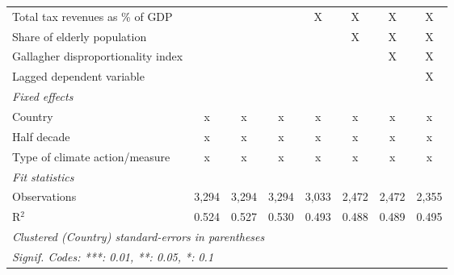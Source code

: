 \begin{table}[htbp]
\begin{tabular}{lccccccc}
      Total tax revenues as \% of GDP                                               &              &              &               & X            & X              & X              & X\\  
      Share of elderly population                                                   &              &              &               &              & X              & X              & X\\  
      Gallagher disproportionality index                                            &              &              &               &              &                & X              & X\\  
      Lagged dependent variable                                                     &              &              &               &              &                &                & X\\  
      \emph{Fixed effects}\\
      Country                                                                       & x            & x            & x             & x            & x              & x              & x\\  
      Half decade                                                                   & x            & x            & x             & x            & x              & x              & x\\  
      Type of climate action/measure                                                & x            & x            & x             & x            & x              & x              & x\\  
      \midrule \emph{Fit statistics}\\
      Observations                                                                  & 3,294        & 3,294        & 3,294         & 3,033        & 2,472          & 2,472          & 2,355\\  
      R$^2$                                                                         & 0.524        & 0.527        & 0.530         & 0.493        & 0.488          & 0.489          & 0.495\\  
      \midrule
      \multicolumn{8}{l}{\emph{Clustered (Country) standard-errors in parentheses}}\\
      \multicolumn{8}{l}{\emph{Signif. Codes: ***: 0.01, **: 0.05, *: 0.1}}\\
   \end{tabular}
\end{table}


